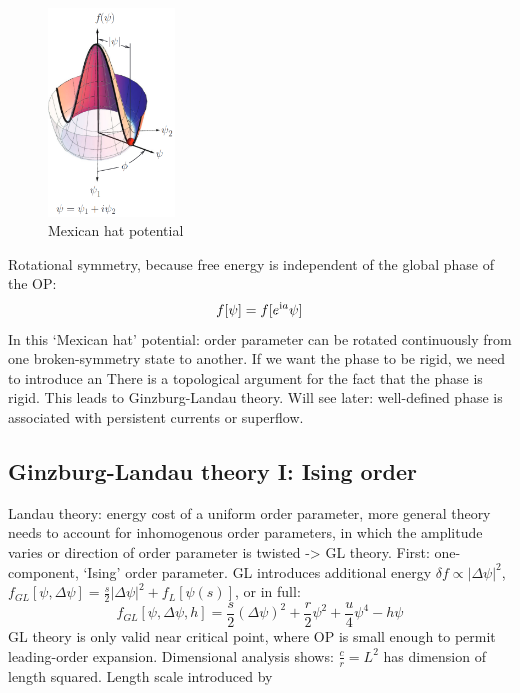 \documentclass[../main.tex]{subfiles}
\begin{document}
\begin{figure}[t]
    \centering
    \includegraphics[width=0.3\textwidth]{images/landau free energy mexican hat}
    \caption{Mexican hat potential}
    \label{fig:Landau free energy mexican hat potential}
\end{figure}

Rotational symmetry, because free energy is independent of the global phase of the OP:
\begin{equation}
    f [\psi] = f [e^{\mathrm{i} a } \psi]
\end{equation}
In this `Mexican hat' potential: order parameter can be rotated continuously from one broken-symmetry state to another.
If we want the phase to be rigid, we need to introduce an
There is a topological argument for the fact that the phase is rigid.
This leads to Ginzburg-Landau theory.
Will see later: well-defined phase is associated with persistent currents or superflow.

\subsection{Ginzburg-Landau theory I: Ising order}

Landau theory: energy cost of a uniform order parameter, more general theory needs to account for inhomogenous order parameters, in which the amplitude varies or direction of order parameter is twisted -> GL theory.
First: one-component, `Ising' order parameter.
GL introduces additional energy \(\delta f \propto \vert \Delta \psi \vert^2\), \(f_{GL} [\psi, \Delta \psi] = \frac{s}{2} \vert \Delta \psi \vert^2 + f_L [\psi(s)]\), or in full:
\begin{equation}
    f_{GL} [\psi, \Delta \psi, h] = \frac{s}{2} (\Delta \psi)^2 + \frac{r}{2} \psi^2 + \frac{u}{4} \psi^4 - h \psi
\end{equation}
GL theory is only valid near critical point, where OP is small enough to permit leading-order expansion.
Dimensional analysis shows: \(\frac{c}{r} = L^2\)  has dimension of length squared.
Length scale introduced by
\end{document}
